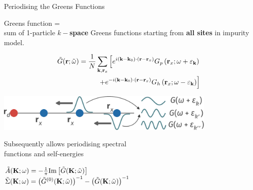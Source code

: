 \documentclass[11pt,aspectratio=169]{beamer}
\newcommand\focus[1]{%
	{\alert{\textbf{#1}}}
}
\begin{document}
\begin{frame}{Periodising the Greens Functions}
	\begin{minipage}{0.4\textwidth}
	Greens function = \\
	sum of 1-particle \focus{\(k-\)space} Greens functions starting from \focus{all sites} in impurity model.
	\end{minipage}
	\hspace{\fill}
	\begin{minipage}{0.54\textwidth}
	\begin{equation*}\begin{aligned}
		\tilde G({\bf r}; \tilde\omega) = \frac{1}{N}\sum_{{\bf k},{\bf r}_x} \left[e^{i \left({\bf k}- {\bf k}_0\right)\cdot\left({\bf r} - {\bf r}_x\right)}G_p\left({\bf r}_x;\omega + \varepsilon_{\bf k}\right) \right. \\
	\left. + e^{-i \left({\bf k}- {\bf k}_0\right)\cdot\left({\bf r} - {\bf r}_x\right)}G_h\left({\bf r}_x;\omega - \varepsilon_{\bf k}\right)\right]
	\end{aligned}\end{equation*}
	\end{minipage}

	\vspace*{\fill}
	\includegraphics[width=0.8\textwidth]{greensFunc.pdf}

	\vspace*{\fill}
	\begin{minipage}{0.45\textwidth}
	Subsequently allows periodising spectral \\ 
	functions and self-energies
	\end{minipage}
	\hspace{\fill}
	\begin{minipage}{0.5\textwidth}
	\(\tilde A({\bf K}; \omega )= -\frac{1}{\pi}\text{Im}\left[\tilde G({\bf K}; \tilde\omega)\right]\)\\
	\(\tilde \Sigma({\bf K}; \omega) = \left(\tilde G^{(0)}({\bf K}; \tilde\omega)\right)^{-1} - \left(\tilde G({\bf K}; \tilde\omega)\right)^{-1}\)
	\end{minipage}
	
\end{frame}
\end{document}
